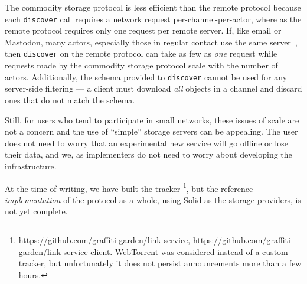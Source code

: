 
The commodity storage protocol is less efficient than the remote protocol because each
\texttt{discover} call requires a network request per-channel-per-actor,
where as the remote protocol requires only one request per remote server.
If, like email or Mastodon, many actors, especially those in regular contact
use the same server~\cite{mastodonchallenges},
then \texttt{discover} on the remote protocol can take as
few as \emph{one} request while requests made by
the commodity storage protocol scale with the number of actors.
Additionally, the schema provided to \texttt{discover} cannot be used for any
server-side filtering --- a client must download \emph{all} objects in a channel
and discard ones that do not match the schema.

Still, for users who tend to participate in small networks, these issues
of scale are not a concern and the use of ``simple'' storage servers can be appealing.
The user does not need to worry that an experimental new service
will go offline or lose their data, and we, as implementers do not need to
worry about developing the infrastructure.

At the time of writing, we have built the tracker
\footnote{
  \url{https://github.com/graffiti-garden/link-service},
  \url{https://github.com/graffiti-garden/link-service-client}.
  WebTorrent was considered instead of a custom tracker,
  but unfortunately it does not persist announcements more than a few hours.
}, but the reference \emph{implementation} of the protocol as a whole,
using Solid as the storage providers,
is not yet complete.



